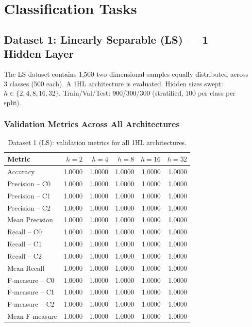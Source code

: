 \documentclass[11pt,a4paper]{article}
\begin{document}
\section{Classification Tasks}

\subsection{Dataset 1: Linearly Separable (LS) --- 1 Hidden Layer}

The LS dataset contains 1,500 two-dimensional samples equally distributed across 3 classes (500 each). A 1HL architecture is evaluated. Hidden sizes swept: $h \in \{2,4,8,16,32\}$. Train/Val/Test: 900/300/300 (stratified, 100 per class per split).

\subsubsection*{Validation Metrics Across All Architectures}

\begin{table}[H]
\centering
\caption{Dataset 1 (LS): validation metrics for all 1HL architectures.}
\small
\begin{tabular}{lrrrrr}
\toprule
Metric & $h=2$ & $h=4$ & $h=8$ & $h=16$ & $h=32$ \\
\midrule
Accuracy        & 1.0000 & 1.0000 & 1.0000 & 1.0000 & 1.0000 \\
Precision -- C0 & 1.0000 & 1.0000 & 1.0000 & 1.0000 & 1.0000 \\
Precision -- C1 & 1.0000 & 1.0000 & 1.0000 & 1.0000 & 1.0000 \\
Precision -- C2 & 1.0000 & 1.0000 & 1.0000 & 1.0000 & 1.0000 \\
Mean Precision  & 1.0000 & 1.0000 & 1.0000 & 1.0000 & 1.0000 \\
Recall -- C0    & 1.0000 & 1.0000 & 1.0000 & 1.0000 & 1.0000 \\
Recall -- C1    & 1.0000 & 1.0000 & 1.0000 & 1.0000 & 1.0000 \\
Recall -- C2    & 1.0000 & 1.0000 & 1.0000 & 1.0000 & 1.0000 \\
Mean Recall     & 1.0000 & 1.0000 & 1.0000 & 1.0000 & 1.0000 \\
F-measure -- C0 & 1.0000 & 1.0000 & 1.0000 & 1.0000 & 1.0000 \\
F-measure -- C1 & 1.0000 & 1.0000 & 1.0000 & 1.0000 & 1.0000 \\
F-measure -- C2 & 1.0000 & 1.0000 & 1.0000 & 1.0000 & 1.0000 \\
Mean F-measure  & 1.0000 & 1.0000 & 1.0000 & 1.0000 & 1.0000 \\
\bottomrule
\end{tabular}
\end{table}
\end{document}
